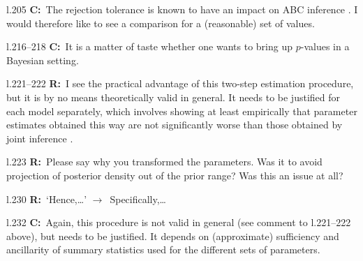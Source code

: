 \documentclass[11pt]{article}
\newenvironment{my_description}
{\begin{description}
  \setlength{\itemsep}{2pt}
  \setlength{\parskip}{0pt}
  \setlength{\parsep}{0pt}}
{\end{description}}
\newcommand{\ra}{$\rightarrow$\ }
\newcommand{\C}{\textbf{C:}\ }
\newcommand{\R}{\textbf{R:}\ }
\begin{document}
\begin{my_description}
	\item[l.205] \C The rejection tolerance is known to have an impact on ABC inference \citep{Beaumont:2010uq}. I would therefore like to see a comparison for a (reasonable) set of values.
	\item[l.216--218] \C It is a matter of taste whether one wants to bring up $p$-values in a Bayesian setting.
	\item[l.221--222] \R I see the practical advantage of this two-step estimation procedure, but it is by no means theoretically valid in general. It needs to be justified for each model separately, which involves showing at least empirically that parameter estimates obtained this way are not significantly worse than those obtained by joint inference \cite[for a detailed treatment of conditional ABC inference, see][]{Bazin:2010mz,Aeschbacher:2013vn}.
	\item[l.223] \R Please say why you transformed the parameters. Was it to avoid projection of posterior density out of the prior range? Was this an issue at all?
	\item[l.230] \R `Hence,\dots' \ra Specifically,\dots
	\item[l.232] \C Again, this procedure is not valid in general (see comment to l.221--222 above), but needs to be justified. It depends on (approximate) sufficiency and ancillarity of summary statistics used for the different sets of parameters.
\end{my_description}
\end{document}
